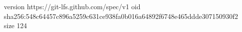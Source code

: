 version https://git-lfs.github.com/spec/v1
oid sha256:548c64457c896a5259c631ce938fa0b016a64892f6748e465ddde307150930f2
size 124
